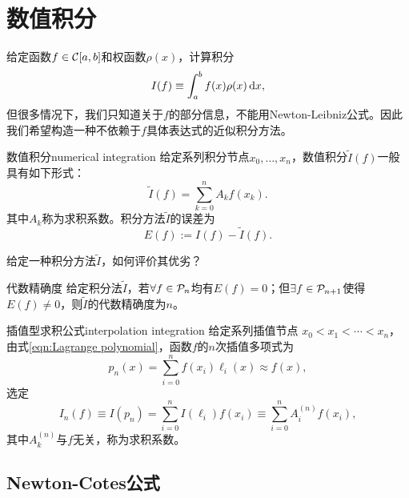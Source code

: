\chapter{数值积分}
\label{chap:numerical integration}

给定函数$f\in\mathcal C[a,b]$和权函数$\rho(x)$，计算积分
\begin{equation}
    I(f)\equiv\int_a^bf(x)\rho(x)\mathop{}\!\mathrm{d} x,
\end{equation}
但很多情况下，我们只知道关于$f$的部分信息，不能用Newton-Leibniz公式。因此我们希望构造一种不依赖于$f$具体表达式的近似积分方法。

\begin{definition}
    {数值积分}{numerical integration}
    给定系列积分节点$x_0,\ldots,x_n$，数值积分$\tilde I(f)$一般具有如下形式：
    \begin{equation}
        \tilde I(f)=\sum_{k=0}^nA_kf(x_k).
    \end{equation}
    其中$A_k$称为求积系数。积分方法$\tilde I$的误差为
    \begin{equation}
        E(f):=I(f)-\tilde I(f).
    \end{equation}
\end{definition}

给定一种积分方法$\tilde I$，如何评价其优劣？

\begin{definition}
    {代数精确度}{}
    给定积分法$\tilde I$，若$\forall f\in\mathcal P_n$均有$E(f)=0$；但$\exists f\in\mathcal P_{n+1}$使得$E(f)\neq 0$，则$\tilde I$的代数精确度为$n$。
\end{definition}

\begin{definition}
    {插值型求积公式}{interpolation integration}
    给定系列插值节点%
    $x_0<x_1<\cdots<x_n$，
    由式\eqref{eqn:Lagrange polynomial}，函数$f$的$n$次插值多项式为
    \[
        p_n(x)=\sum_{i=0}^nf(x_i)\ell_i(x)\approx f(x),
    \]
    选定
    \begin{equation}
        I_n(f)\equiv I(p_n)=\sum_{i=0}^nI(\ell_i)f(x_i)\equiv\sum_{i=0}^nA_i^{(n)}f(x_i),
    \end{equation}
    其中$A_k^{(n)}$与$f$无关，称为求积系数。
\end{definition}

\section{Newton-Cotes公式}
\label{sec:Newton-Cotes formula}

